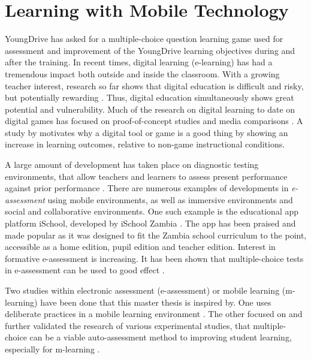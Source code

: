 \section{Learning with Mobile Technology}

    YoungDrive has asked for a multiple-choice question learning game used for assessment and improvement of the YoungDrive learning objectives during and after the training. In recent times, digital learning (e-learning) has had a tremendous impact both outside and inside the classroom. With a growing teacher interest, research so far shows that digital education is difficult and risky, but potentially rewarding \citep{luckin}. Thus, digital education simultaneously shows great potential and vulnerability. Much of the research on digital learning to date on digital games has focused on proof-of-concept studies and media comparisons \citep{luckin}. A study by \cite{gates} motivates why a digital tool or game is a good thing by showing an increase in learning outcomes, relative to non-game instructional conditions.


    A large amount of development has taken place on diagnostic testing environments, that allow teachers and learners to assess present performance against prior performance \citep{luckin}. There are numerous examples of developments in \textit{e-assessment} using mobile environments, as well as immersive environments and social and collaborative environments. One such example is the educational app platform iSchool, developed by iSchool Zambia \citep{ischool}. The app has been praised and made popular as it was designed to fit the Zambia school curriculum to the point, accessible as a home edition, pupil edition and teacher edition. Interest in formative e-assessment is increasing.  It has been shown that multiple-choice tests in e-assessment can be used to good effect \citep{nicol}.

    Two studies within electronic assessment (e-assessment) or mobile learning (m-learning) have been done that this master thesis is inspired by. One uses deliberate practices in a mobile learning environment \citep{yengin}. The other focused on and further validated the research of various experimental studies, that multiple-choice can be a viable auto-assessment method to improving student learning, especially for m-learning \citep{de-marcos}.

